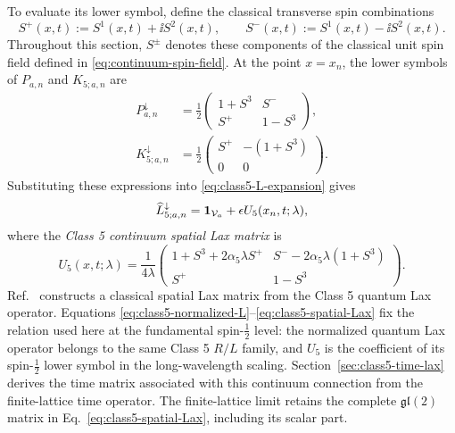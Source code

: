To evaluate its lower symbol, define the classical transverse spin
combinations
\begin{equation}
S^+(x,t):=S^1(x,t)+\ii S^2(x,t),
\qquad
S^-(x,t):=S^1(x,t)-\ii S^2(x,t).
\label{eq:class5-spin-pm}
\end{equation}
Throughout this section, $S^{\pm}$ denotes these components of the classical
unit spin field defined in \eqref{eq:continuum-spin-field}.  At the point $x=x_n$, the lower symbols of
$P_{a,n}$ and $K_{5;a,n}$ are
\begin{align}
P_{a,n}^{\downarrow}
&=
\frac12
\begin{pmatrix}
1+S^3&S^-\\
S^+&1-S^3
\end{pmatrix},
\label{eq:class5-P-lower-symbol}\\
K_{5;a,n}^{\downarrow}
&=
\frac12
\begin{pmatrix}
S^+&-(1+S^3)\\
0&0
\end{pmatrix}.
\label{eq:class5-K-lower-symbol}
\end{align}
Substituting these expressions into \eqref{eq:class5-L-expansion} gives
\begin{equation}
\widehat L_{5;a,n}^{\downarrow}
=
\mathbf{1}_{\mathcal V_a}
+\epsilon U_5(x_n,t;\lambda),
\label{eq:class5-L-lower-expansion}
\end{equation}
where the \emph{Class 5 continuum spatial Lax matrix} is
\begin{equation}
U_5(x,t;\lambda)
=
\frac{1}{4\lambda}
\begin{pmatrix}
1+S^3+2\alpha_5\lambda S^+
&
S^- -2\alpha_5\lambda(1+S^3)\\
S^+
&
1-S^3
\end{pmatrix}.
\label{eq:class5-spatial-Lax}
\end{equation}
Ref.~\cite{deLeeuwFontanellaNietoGarcia2026} constructs a classical spatial
Lax matrix from the Class 5 quantum Lax operator.  Equations
\eqref{eq:class5-normalized-L}--\eqref{eq:class5-spatial-Lax} fix the relation
used here at the fundamental spin-$\tfrac12$ level: the normalized quantum
Lax operator belongs to the same Class 5 $R/L$ family, and $U_5$ is the
coefficient of its spin-$\tfrac12$ lower symbol in the long-wavelength
scaling.  Section~\ref{sec:class5-time-lax} derives the time matrix associated
with this continuum connection from the finite-lattice time operator.
The finite-lattice limit retains the complete $\mathfrak{gl}(2)$ matrix in
Eq.~\eqref{eq:class5-spatial-Lax}, including its scalar part.
